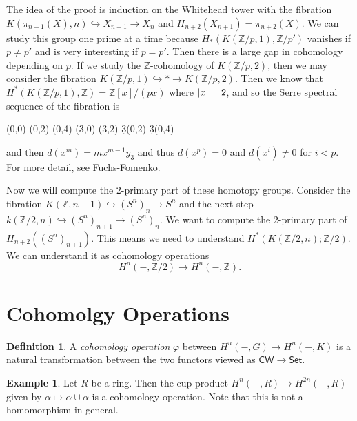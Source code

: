 \documentclass[leqno, openany]{memoir}
\theoremstyle{definition}
\newtheorem{defn}[thm]{Definition}
\newtheorem{exm}[thm]{Example}
\theoremstyle{remark}
\theoremstyle{plain}
\theoremstyle{definition}
\theoremstyle{remark}
\newcommand{\Z}{\mathbb{Z}}
\newcommand{\ms}[1]{\mathsf{#1}}
\begin{document}
The idea of the proof is induction on the Whitehead tower with the fibration $K(\pi_{n-1}(X), n) \hookrightarrow X_{n+1} \to X_n$ and $H_{n+2}(X_{n+1}) = \pi_{n+2}(X)$. We can study this group one prime at a time because $H_*(K(\Z/p, 1), \Z/p')$ vanishes if $p \neq p'$ and is very interesting if $p = p'$. Then there is a large gap in cohomology depending on $p$. If we study the $\Z$-cohomology of $K(\Z/p, 2)$, then we may consider the fibration $K(\Z/p, 1) \hookrightarrow * \to K(\Z/p, 2)$. Then we know that
$H^*(K(\Z/p, 1), \Z) = \Z[x]/(px)$ where $\abs{x} = 2$, and so the Serre spectral sequence of the fibration is
\begin{center}
    \begin{sseqdata}[name=kzp2, classes={draw=none}, cohomological Serre grading]
        \class["1"](0,0)
        \class["x"](0,2)
        \class["x^2"](0,4)
        \class["y_3"](3,0)
        \class["xy_3"](3,2)
        \d3(0,2)
        \d3(0,4)
    \end{sseqdata}
    \printpage[name=kzp2, page=3]
\end{center}
and then $d(x^m) = mx^{m-1} y_3$ and thus $d(x^p) = 0$ and $d(x^i) \neq 0$ for $i<p$. For more detail, see Fuchs-Fomenko.

Now we will compute the $2$-primary part of these homotopy groups. Consider the fibration $K(\Z, n-1) \hookrightarrow {(S^n)}_n \to S^n$ and the next step $k(\Z/2, n) \hookrightarrow {(S^n)}_{n+1} \to {(S^n)}_n$. We want to compute the $2$-primary part of $H_{n+2}({(S^n)}_{n+1})$. This means we need to understand $H^*(K(\Z/2, n); \Z/2)$. We can understand it as cohomology operations
\[ H^n(-, \Z/2) \to H^n(-, \Z). \]

\section{Cohomolgy Operations}%
\label{sec:cohomolgy_operations}

\begin{defn}
    A \textit{cohomology operation} $\varphi$ between $H^n(-,G) \to H^n(-,K)$ is a natural transformation between the two functors viewed as $\ms{CW} \to \ms{Set}$.
\end{defn}

\begin{exm}
    Let $R$ be a ring. Then the cup product $H^n(-,R) \to H^{2n}(-,R)$ given by $\alpha \mapsto \alpha \cup \alpha$ is a cohomology operation. Note that this is not a homomorphism in general.
\end{exm}
\end{document}
